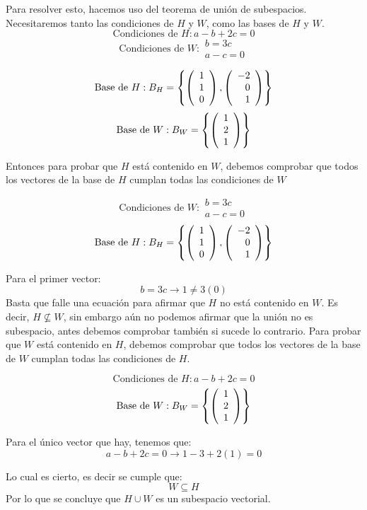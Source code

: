 \begin{sol}
Para resolver esto, hacemos uso del teorema de unión de subespacios. Necesitaremos tanto las condiciones de $H$ y $W$, como las bases de $H$ y $W$.
$$\text{Condiciones de }H: a-b+2c = 0$$
$$\text{Condiciones de }W: \begin{array}{c}
    b = 3c\\
    a-c=0
\end{array}$$

$$\text{Base de }H: B_H =  \left\{\left( \begin{array}{r} 1\\ 1\\ 0 \end{array} \right) ,\left( \begin{array}{r} -2\\ 0\\ 1 \end{array} \right)  \right\} $$
$$\text{Base de }W: B_W =  \left\{\left( \begin{array}{r} 1\\ 2\\ 1 \end{array} \right)  \right\} $$

Entonces para probar que $H$ está contenido en $W$, debemos comprobar que todos los vectores de la base de $H$ cumplan todas las condiciones de $W$

$$\text{Condiciones de }W: \begin{array}{c}
    b = 3c\\
    a-c=0
\end{array}$$
$$\text{Base de }H: B_H =  \left\{\left( \begin{array}{r} 1\\ 1\\ 0 \end{array} \right) ,\left( \begin{array}{r} -2\\ 0\\ 1 \end{array} \right)  \right\} $$

Para el primer vector:
$$b = 3c \longrightarrow 1 \neq 3(0)$$
Basta que falle una ecuación para afirmar que $H$ no está contenido en $W$. Es decir, $H \nsubseteq W$, sin embargo aún no podemos afirmar que la unión no es subespacio, antes debemos comprobar también si sucede lo contrario. Para probar que $W$ está contenido en $H$, debemos comprobar que todos los vectores de la base de $W$ cumplan todas las condiciones de $H$.

$$\text{Condiciones de }H: a-b+2c = 0$$
$$\text{Base de }W: B_W =  \left\{\left( \begin{array}{r} 1\\ 2\\ 1 \end{array} \right)  \right\} $$

Para el único vector que hay, tenemos que:
$$a -b +2c=0 \longrightarrow 1-3 +2(1)=0$$

Lo cual es cierto, es decir se cumple que: 
$$W \subseteq H$$
Por lo que se concluye que $H \cup W$ es un subespacio vectorial.
\end{sol}




